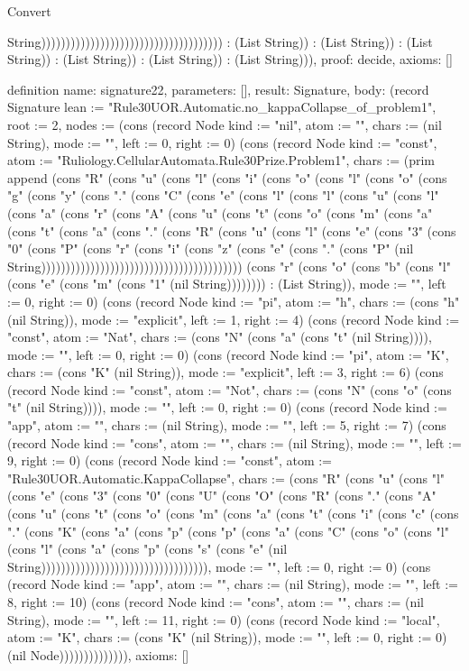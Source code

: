 \begin{lexlean}{Convert}
\begin{semanticmodule}
{String))))))))))))))))))))))))))))))))))))) : (List String)) : (List String)) : (List String)) : (List String)) : (List String)) : (List String))),
  proof: decide{},
  axioms: []
}

definition{
  name: signature22,
  parameters: [],
  result: Signature,
  body: (record Signature {lean := "Rule30UOR.Automatic.no_kappaCollapse_of_problem1", root := 2, nodes := (cons (record Node {kind := "nil", atom := "", chars := (nil String), mode := "", left := 0, right := 0}) (cons (record Node {kind := "const", atom := "Ruliology.CellularAutomata.Rule30Prize.Problem1", chars := (prim append (cons "R" (cons "u" (cons "l" (cons "i" (cons "o" (cons "l" (cons "o" (cons "g" (cons "y" (cons "." (cons "C" (cons "e" (cons "l" (cons "l" (cons "u" (cons "l" (cons "a" (cons "r" (cons "A" (cons "u" (cons "t" (cons "o" (cons "m" (cons "a" (cons "t" (cons "a" (cons "." (cons "R" (cons "u" (cons "l" (cons "e" (cons "3" (cons "0" (cons "P" (cons "r" (cons "i" (cons "z" (cons "e" (cons "." (cons "P" (nil String))))))))))))))))))))))))))))))))))))))))) (cons "r" (cons "o" (cons "b" (cons "l" (cons "e" (cons "m" (cons "1" (nil String)))))))) : (List String)), mode := "", left := 0, right := 0}) (cons (record Node {kind := "pi", atom := "h", chars := (cons "h" (nil String)), mode := "explicit", left := 1, right := 4}) (cons (record Node {kind := "const", atom := "Nat", chars := (cons "N" (cons "a" (cons "t" (nil String)))), mode := "", left := 0, right := 0}) (cons (record Node {kind := "pi", atom := "K", chars := (cons "K" (nil String)), mode := "explicit", left := 3, right := 6}) (cons (record Node {kind := "const", atom := "Not", chars := (cons "N" (cons "o" (cons "t" (nil String)))), mode := "", left := 0, right := 0}) (cons (record Node {kind := "app", atom := "", chars := (nil String), mode := "", left := 5, right := 7}) (cons (record Node {kind := "cons", atom := "", chars := (nil String), mode := "", left := 9, right := 0}) (cons (record Node {kind := "const", atom := "Rule30UOR.Automatic.KappaCollapse", chars := (cons "R" (cons "u" (cons "l" (cons "e" (cons "3" (cons "0" (cons "U" (cons "O" (cons "R" (cons "." (cons "A" (cons "u" (cons "t" (cons "o" (cons "m" (cons "a" (cons "t" (cons "i" (cons "c" (cons "." (cons "K" (cons "a" (cons "p" (cons "p" (cons "a" (cons "C" (cons "o" (cons "l" (cons "l" (cons "a" (cons "p" (cons "s" (cons "e" (nil String)))))))))))))))))))))))))))))))))), mode := "", left := 0, right := 0}) (cons (record Node {kind := "app", atom := "", chars := (nil String), mode := "", left := 8, right := 10}) (cons (record Node {kind := "cons", atom := "", chars := (nil String), mode := "", left := 11, right := 0}) (cons (record Node {kind := "local", atom := "K", chars := (cons "K" (nil String)), mode := "", left := 0, right := 0}) (nil Node)))))))))))))}),
  axioms: []
}


\end{semanticmodule}
\end{lexlean}
